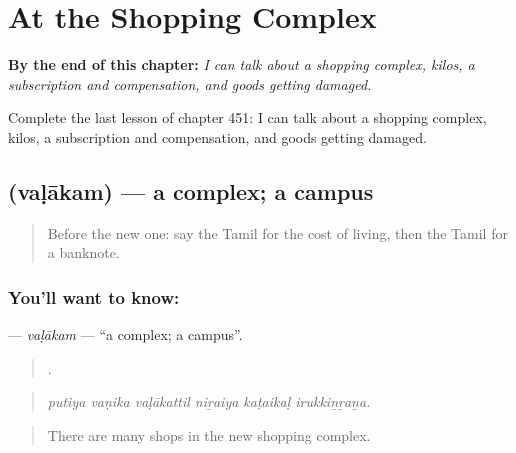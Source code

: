 
\chapter{At the Shopping Complex}
\label{ch:ta-at-the-shopping-complex}

\begin{chapteropening}
\textbf{By the end of this chapter:} \emph{I can talk about a shopping complex, kilos, a subscription and compensation, and goods getting damaged.}

Complete the last lesson of chapter 451: I can talk about a shopping complex, kilos, a subscription and compensation, and goods getting damaged.
\end{chapteropening}

\section[\texorpdfstring{\ta{வளாகம்} (vaḷākam)}{வளாகம் (vaḷākam)}]{ (vaḷākam) — a complex; a campus}

\label{lesson:TA-C451-valakam}



\begin{quote}
Before the new one: say the Tamil for the cost of living, then the Tamil for a banknote.
\end{quote}

\subsection*{You'll want to know: }
\textbf{} — \emph{vaḷākam} — \textquotedblleft{}a complex; a campus\textquotedblright{}.

\begin{quote}
     .
\end{quote}

\begin{quote}
\emph{putiya vaṇika vaḷākattil niṟaiya kaṭaikaḷ irukkiṉṟaṉa.}
\end{quote}

\begin{quote}
There are many shops in the new shopping complex.
\end{quote}

